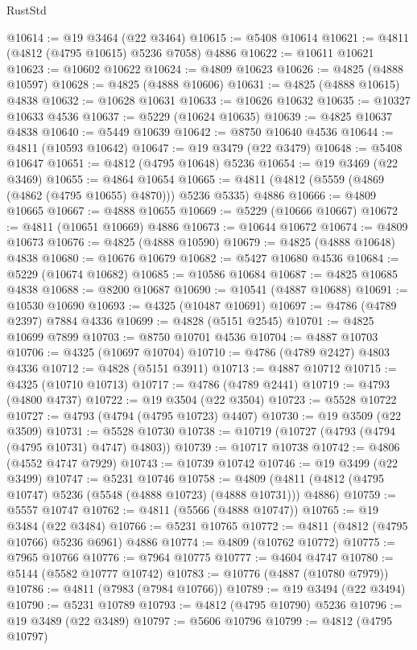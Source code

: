 \begin{lexlean}{RustStd}
\begin{coremodule}
@10614 := @19 @3464 (@22 @3464)
@10615 := @5408 @10614
@10621 := @4811 (@4812 (@4795 @10615) @5236 @7058) @4886
@10622 := @10611 @10621
@10623 := @10602 @10622
@10624 := @4809 @10623
@10626 := @4825 (@4888 @10597)
@10628 := @4825 (@4888 @10606)
@10631 := @4825 (@4888 @10615) @4838
@10632 := @10628 @10631
@10633 := @10626 @10632
@10635 := @10327 @10633 @4536
@10637 := @5229 (@10624 @10635)
@10639 := @4825 @10637 @4838
@10640 := @5449 @10639
@10642 := @8750 @10640 @4536
@10644 := @4811 (@10593 @10642)
@10647 := @19 @3479 (@22 @3479)
@10648 := @5408 @10647
@10651 := @4812 (@4795 @10648) @5236
@10654 := @19 @3469 (@22 @3469)
@10655 := @4864 @10654
@10665 := @4811 (@4812 (@5559 (@4869 (@4862 (@4795 @10655) @4870))) @5236 @5335) @4886
@10666 := @4809 @10665
@10667 := @4888 @10655
@10669 := @5229 (@10666 @10667)
@10672 := @4811 (@10651 @10669) @4886
@10673 := @10644 @10672
@10674 := @4809 @10673
@10676 := @4825 (@4888 @10590)
@10679 := @4825 (@4888 @10648) @4838
@10680 := @10676 @10679
@10682 := @5427 @10680 @4536
@10684 := @5229 (@10674 @10682)
@10685 := @10586 @10684
@10687 := @4825 @10685 @4838
@10688 := @8200 @10687
@10690 := @10541 (@4887 @10688)
@10691 := @10530 @10690
@10693 := @4325 (@10487 @10691)
@10697 := @4786 (@4789 @2397) @7884 @4336
@10699 := @4828 (@5151 @2545)
@10701 := @4825 @10699 @7899
@10703 := @8750 @10701 @4536
@10704 := @4887 @10703
@10706 := @4325 (@10697 @10704)
@10710 := @4786 (@4789 @2427) @4803 @4336
@10712 := @4828 (@5151 @3911)
@10713 := @4887 @10712
@10715 := @4325 (@10710 @10713)
@10717 := @4786 (@4789 @2441)
@10719 := @4793 (@4800 @4737)
@10722 := @19 @3504 (@22 @3504)
@10723 := @5528 @10722
@10727 := @4793 (@4794 (@4795 @10723) @4407)
@10730 := @19 @3509 (@22 @3509)
@10731 := @5528 @10730
@10738 := @10719 (@10727 (@4793 (@4794 (@4795 @10731) @4747) @4803))
@10739 := @10717 @10738
@10742 := @4806 (@4552 @4747 @7929)
@10743 := @10739 @10742
@10746 := @19 @3499 (@22 @3499)
@10747 := @5231 @10746
@10758 := @4809 (@4811 (@4812 (@4795 @10747) @5236 (@5548 (@4888 @10723) (@4888 @10731))) @4886)
@10759 := @5557 @10747
@10762 := @4811 (@5566 (@4888 @10747))
@10765 := @19 @3484 (@22 @3484)
@10766 := @5231 @10765
@10772 := @4811 (@4812 (@4795 @10766) @5236 @6961) @4886
@10774 := @4809 (@10762 @10772)
@10775 := @7965 @10766
@10776 := @7964 @10775
@10777 := @4604 @4747
@10780 := @5144 (@5582 @10777 @10742)
@10783 := @10776 (@4887 (@10780 @7979))
@10786 := @4811 (@7983 (@7984 @10766))
@10789 := @19 @3494 (@22 @3494)
@10790 := @5231 @10789
@10793 := @4812 (@4795 @10790) @5236
@10796 := @19 @3489 (@22 @3489)
@10797 := @5606 @10796
@10799 := @4812 (@4795 @10797)

\end{coremodule}
\end{lexlean}
